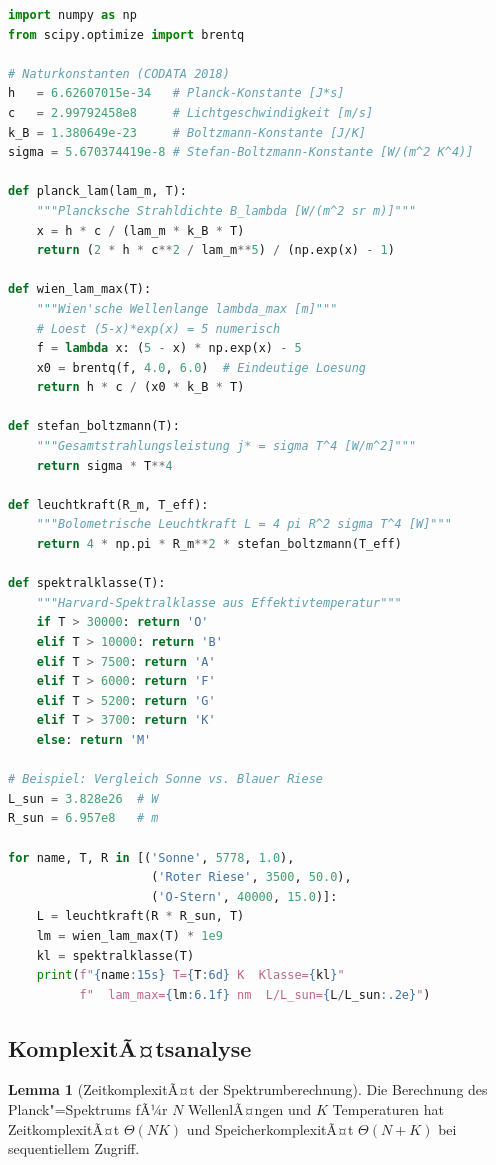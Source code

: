 ﻿\documentclass[a4paper,12pt]{article}
\theoremstyle{definition}
\newtheorem{lemma}{Lemma}
\begin{document}
\begin{lstlisting}[language=Python,
    caption={VollstÃ¤ndige Implementierung der SchwarzkÃ¶rperphysik},
    label={lst:planck}]
import numpy as np
from scipy.optimize import brentq

# Naturkonstanten (CODATA 2018)
h   = 6.62607015e-34   # Planck-Konstante [J*s]
c   = 2.99792458e8     # Lichtgeschwindigkeit [m/s]
k_B = 1.380649e-23     # Boltzmann-Konstante [J/K]
sigma = 5.670374419e-8 # Stefan-Boltzmann-Konstante [W/(m^2 K^4)]

def planck_lam(lam_m, T):
    """Plancksche Strahldichte B_lambda [W/(m^2 sr m)]"""
    x = h * c / (lam_m * k_B * T)
    return (2 * h * c**2 / lam_m**5) / (np.exp(x) - 1)

def wien_lam_max(T):
    """Wien'sche Wellenlange lambda_max [m]"""
    # Loest (5-x)*exp(x) = 5 numerisch
    f = lambda x: (5 - x) * np.exp(x) - 5
    x0 = brentq(f, 4.0, 6.0)  # Eindeutige Loesung
    return h * c / (x0 * k_B * T)

def stefan_boltzmann(T):
    """Gesamtstrahlungsleistung j* = sigma T^4 [W/m^2]"""
    return sigma * T**4

def leuchtkraft(R_m, T_eff):
    """Bolometrische Leuchtkraft L = 4 pi R^2 sigma T^4 [W]"""
    return 4 * np.pi * R_m**2 * stefan_boltzmann(T_eff)

def spektralklasse(T):
    """Harvard-Spektralklasse aus Effektivtemperatur"""
    if T > 30000: return 'O'
    elif T > 10000: return 'B'
    elif T > 7500: return 'A'
    elif T > 6000: return 'F'
    elif T > 5200: return 'G'
    elif T > 3700: return 'K'
    else: return 'M'

# Beispiel: Vergleich Sonne vs. Blauer Riese
L_sun = 3.828e26  # W
R_sun = 6.957e8   # m

for name, T, R in [('Sonne', 5778, 1.0),
                    ('Roter Riese', 3500, 50.0),
                    ('O-Stern', 40000, 15.0)]:
    L = leuchtkraft(R * R_sun, T)
    lm = wien_lam_max(T) * 1e9
    kl = spektralklasse(T)
    print(f"{name:15s} T={T:6d} K  Klasse={kl}"
          f"  lam_max={lm:6.1f} nm  L/L_sun={L/L_sun:.2e}")
\end{lstlisting}

\subsection{KomplexitÃ¤tsanalyse}

\begin{lemma}[ZeitkomplexitÃ¤t der Spektrumberechnung]
\label{lem:komplex}
    Die Berechnung des Planck"=Spektrums fÃ¼r $N$ WellenlÃ¤ngen und $K$
    Temperaturen hat ZeitkomplexitÃ¤t $\Theta(NK)$ und SpeicherkomplexitÃ¤t
    $\Theta(N + K)$ bei sequentiellem Zugriff.
\end{lemma}
\end{document}
